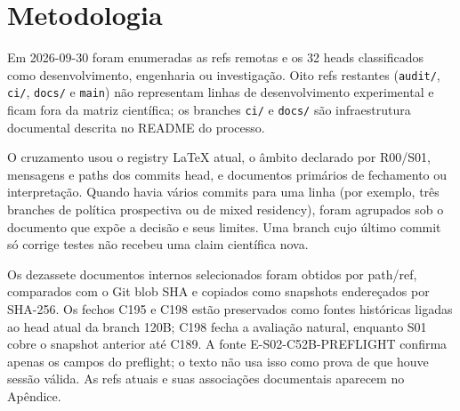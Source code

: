 \section{Metodologia}
Em 2026-09-30 foram enumeradas as refs remotas e os 32 heads classificados como desenvolvimento, engenharia ou investigação. Oito refs restantes (\texttt{audit/}, \texttt{ci/}, \texttt{docs/} e \texttt{main}) não representam linhas de desenvolvimento experimental e ficam fora da matriz científica; os branches \texttt{ci/} e \texttt{docs/} são infraestrutura documental descrita no README do processo.

O cruzamento usou o registry LaTeX atual, o âmbito declarado por R00/S01, mensagens e paths dos commits head, e documentos primários de fechamento ou interpretação. Quando havia vários commits para uma linha (por exemplo, três branches de política prospectiva ou de mixed residency), foram agrupados sob o documento que expõe a decisão e seus limites. Uma branch cujo último commit só corrige testes não recebeu uma claim científica nova.

Os dezassete documentos internos selecionados foram obtidos por path/ref, comparados com o Git blob SHA e copiados como snapshots endereçados por SHA-256. Os fechos C195 e C198 estão preservados como fontes históricas ligadas ao head atual da branch 120B; C198 fecha a avaliação natural, enquanto S01 cobre o snapshot anterior até C189. A fonte E-S02-C52B-PREFLIGHT confirma apenas os campos do preflight; o texto não usa isso como prova de que houve sessão válida. As refs atuais e suas associações documentais aparecem no Apêndice.
